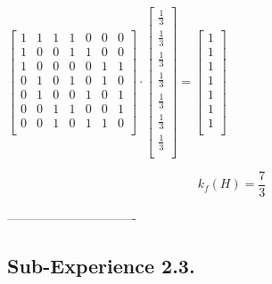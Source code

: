 \documentclass[10pt, AMS Euler]{article}
\begin{document}
\begin{center}
    $
    \begin{bmatrix}
    1 & 1 & 1 & 1 & 0 & 0 & 0 \\
    1 & 0 & 0 & 1 & 1 & 0 & 0 \\
    1 & 0 & 0 & 0 & 0 & 1 & 1 \\
    0 & 1 & 0 & 1 & 0 & 1 & 0 \\
    0 & 1 & 0 & 0 & 1 & 0 & 1 \\
    0 & 0 & 1 & 1 & 0 & 0 & 1 \\
    0 & 0 & 1 & 0 & 1 & 1 & 0 \\
    \end{bmatrix}
    \cdot
    \begin{bmatrix}
    \frac{1}{3} \\
    \frac{1}{3} \\
    \frac{1}{3} \\
    \frac{1}{3} \\
    \frac{1}{3} \\
    \frac{1}{3} \\
    \frac{1}{3} \\
    \end{bmatrix}
    =
    \begin{bmatrix}
    1 \\
    1 \\
    1 \\
    1 \\
    1 \\
    1 \\
    1 \\
    \end{bmatrix}    
    $
\end{center}

$$ k_f(H) = \frac{7}{3} $$

-------------------------------

\subsection*{Sub-Experience 2.3.}
	
\end{document}
